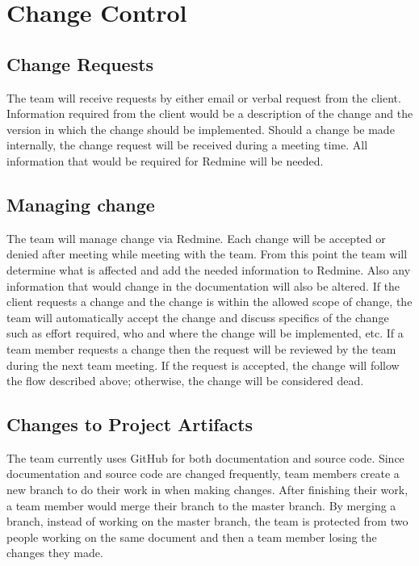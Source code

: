 \section{Change Control}
\subsection{Change Requests}
The team will receive requests by either email or verbal request from the client.  Information required from the client would be a description of the change and the version in which the change should be implemented.  Should a change be made internally, the change request will be received during a meeting time.  All information that would be required for Redmine will be needed.

\subsection{Managing change}
The team will manage change via Redmine.  Each change will be accepted or denied after meeting while meeting with the team.  From this point the team will determine what is affected and add the needed information to Redmine.  Also any information that would change in the documentation will also be altered.  If the client requests a change and the change is within the allowed scope of change, the team will automatically accept the change and discuss specifics of the change such as effort required, who and where the change will be implemented, etc. If a team member requests a change then the request will be reviewed by the team during the next team meeting.  If the request is accepted, the change will follow the flow described above; otherwise, the change will be considered dead.

\subsection{Changes to Project Artifacts}
The team currently uses GitHub for both documentation and source code.  Since documentation and source code are changed frequently, team members create a new branch to do their work in when making changes.  After finishing their work, a team member would merge their branch to the master branch.  By merging a branch, instead of working on the master branch, the team is protected from two people working on the same document and then a team member losing the changes they made.
